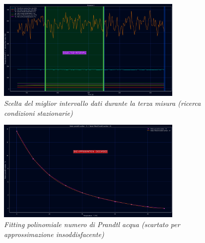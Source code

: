 \documentclass[a4paper,10pt]{article}                                                                                       %
\begin{document}
\begin{figure}[H]                                                                                                           %
  \caption{\textit{Scelta del miglior intervallo dati durante la terza misura (ricerca condizioni stazionarie)}}            %
  \label{fig:measure1}                                                                                                      %
  \vspace{3mm}                                                                                                              %
  \centering                                                                                                                %
  \includegraphics[width=0.8\textwidth]{../final_doc/code_exports/imgs/measure3.png}                                        %
\end{figure}                                                                                                                %
\begin{figure}[H]                                                                                                           %
  \caption{\textit{Fitting polinomiale numero di Prandtl acqua (scartato per approssimazione insoddisfacente)}}             %
  \label{fig:water_fitted_pr}                                                                                               %
  \vspace{3mm}                                                                                                              %
  \centering                                                                                                                %
  \includegraphics[width=0.8\textwidth]{../final_doc/code_exports/imgs/water_fitted_pr.png}                                 %
\end{figure}                                                                                                                %
\end{document}
